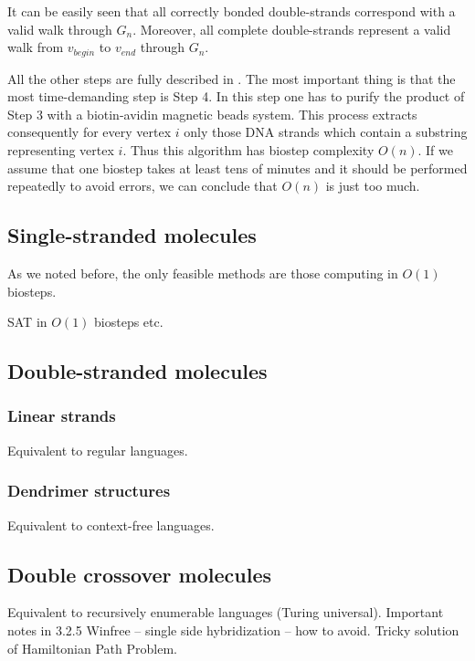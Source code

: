 	It can be easily seen that all correctly bonded double-strands correspond with a valid walk through $G_n$. Moreover, all complete double-strands represent a valid walk from $v_{begin}$ to $v_{end}$ through $G_n$.
	
	All the other steps are fully described in \cite{adleman94}. The most important thing is that the most time-demanding step is Step 4. In this step one has to purify the product of Step 3 with a biotin-avidin magnetic beads system. This process extracts consequently for every vertex $i$ only those DNA strands which contain a substring representing vertex $i$. Thus this algorithm has biostep complexity $O(n)$. If we assume that one biostep takes at least tens of minutes and it should be performed repeatedly to avoid errors, we can conclude that $O(n)$ is just too much.

\subsection{Single-stranded molecules}
	
	As we noted before, the only feasible methods are those computing in $O(1)$ biosteps.
	
	SAT in $O(1)$ biosteps etc.

\subsection{Double-stranded molecules}
	
	\subsubsection{Linear strands}
		
		Equivalent to regular languages.
	
	\subsubsection{Dendrimer structures}
		
		Equivalent to context-free languages.

\subsection{Double crossover molecules}
	
	Equivalent to recursively enumerable languages (Turing universal). Important notes in 3.2.5 Winfree -- single side hybridization -- how to avoid. Tricky solution of Hamiltonian Path Problem.